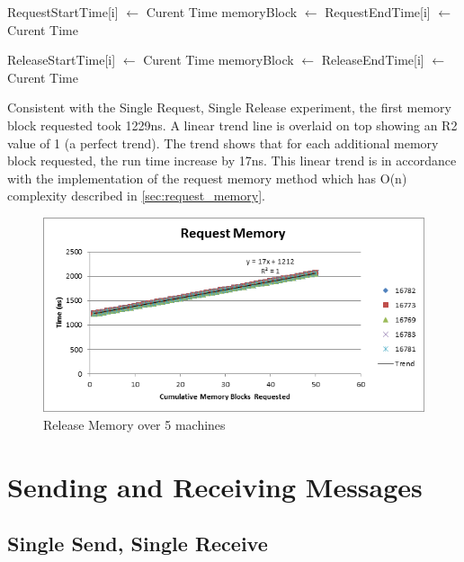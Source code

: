 \documentclass[12pt]{report}
\begin{document}
\begin{algorithmic}
      \State RequestStartTime[i] $\gets$ Curent Time
      \State memoryBlock $\gets$  
      \State RequestEndTime[i] $\gets$ Curent Time
    \EndFor
  \EndFunction
\end{algorithmic}

\begin{algorithmic}
      \State ReleaseStartTime[i] $\gets$ Curent Time
      \State memoryBlock $\gets$  
      \State ReleaseEndTime[i] $\gets$ Curent Time
    \EndFor
  \EndFunction
\end{algorithmic}

\par Consistent with the Single Request, Single Release experiment, the first memory block requested took 1229ns. A linear trend line is overlaid on top showing an R2 value of 1 (a perfect trend). The trend shows that for each additional memory block requested, the run time increase by 17ns. This linear trend is in accordance with the implementation of the request memory method which has O(n) complexity described in \ref{sec:request_memory}.

\begin{figure}[h!]
  \centering
    \includegraphics{RequestMemory.png}
  \caption{Release Memory over 5 machines}
\end{figure}

\section{Sending and Receiving Messages}
\subsection{Single Send, Single Receive}
\label{sec:single_send_single_receive}
\end{document}
